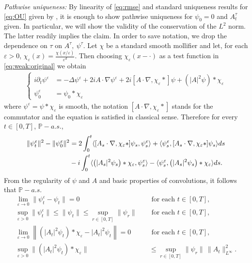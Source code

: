 \documentclass[a4paper,10pt]{amsart}
\renewcommand{\epsilon}{\varepsilon}
\theoremstyle{remark}
\numberwithin{equation}{section}
\begin{document}
\noindent\emph{Pathwise uniqueness:} By linearity of \eqref{eq:rmse} and standard uniqueness results for \eqref{eq:OU} given by \cite[Chapter 5]{da2014stochastic}, it is enough to show pathwise uniqueness for $\psi_0=0$ and $A^{\tau}_t$ given. In particular, we will show the validity of the conservation of the $L^2$ norm. The latter readily implies the claim. In order to save notation, we drop the dependence on $\tau$ on $A^\tau,\ \psi^\tau$. Let $\chi$ be a standard smooth mollifier and let, for each $\epsilon>0$, $\chi_{\epsilon}(x)=\frac{\chi(x/\epsilon)}{\epsilon^d}$. Then choosing $\chi_\epsilon(x-\cdot)$ as a test function in \eqref{eq:weak:original} we obtain
\begin{align*}
     \begin{cases}
            i\partial_t \psi^{\epsilon}&=-\Delta \psi^{\epsilon}+ 2iA\cdot\nabla \psi^{\epsilon}+2i[A\cdot\nabla,\chi_{\epsilon}\ast]\psi+\left(|A|^2\psi\right)\ast\chi_{\epsilon}\\
            \psi^{\epsilon}_0&=\psi_0\ast \chi_{\epsilon}
        \end{cases}
\end{align*}
    where $\psi^{\epsilon}=\psi\ast \chi_{\epsilon}$ is smooth, the notation $[A\cdot\nabla,\chi_{\epsilon}\ast]$ stands for the commutator and the equation is satisfied in classical sense. 
    Therefore
    for every $t\in[0,T]$, $\mathbb{P}-a.s.$,
\begin{align}\label{eq:mollified_estimate_uniqueness}
        \|\psi^{\epsilon}_t\|^2-\|\psi^{\epsilon}_0\|^2&= 2\int_0^t \langle [A_s\cdot\nabla,\chi_{\epsilon}\ast]\psi_s,\psi^{\epsilon}_s\rangle +\langle\psi^{\epsilon}_s,[A_s\cdot\nabla,\chi_{\epsilon}\ast]\psi_s\rangle ds\notag\\ & -i\int_0^t 
        \langle \left(|A_s|^2\psi_s\right)\ast\chi_{\epsilon},\psi^{\epsilon}_s\rangle-\langle \psi^{\epsilon}_s,\left(|A_s|^2\psi_s\right)\ast\chi_{\epsilon}\rangle
        ds.
    \end{align}
    From the regularity of $\psi$ and $A$ and basic properties of convolutions, it follows that $\mathbb{P}-a.s.$
    \begin{align*}
\lim_{\epsilon\rightarrow 0}\|\psi^\epsilon_t-\psi_t\|=0 \quad &\mbox{ for each } t\in [0,T],\\
 \sup_{\epsilon>0} \|\psi^\epsilon_t\|\leq \|\psi_t\|
\leq\sup_{r\in[0,T]}\|\psi_r\|\quad &\mbox{ for each } t\in [0,T],\\
\lim_{\epsilon\rightarrow 0}\left\|\left(|A_t|^2\psi_t\right)\ast\chi_{\epsilon}-|A_t|^2\psi_t\right\|=0\quad &\mbox{ for each } t\in [0,T],\\
 \sup_{\epsilon>0} \|\left(|A_t|^2\psi_t\right)\ast\chi_{\epsilon}\|
&\leq\sup_{r\in[0,T]}\|\psi_r\|\,
\|A_t\|_{L^\infty}^2.
    \end{align*}
\end{document}
